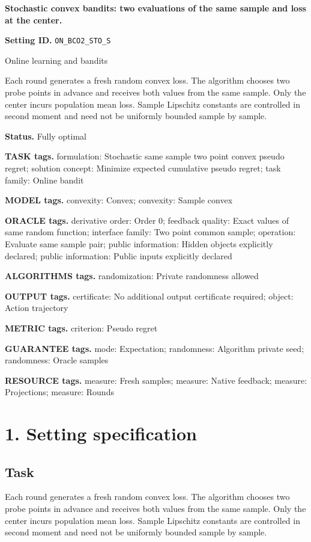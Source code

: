 \documentclass[10pt,a4paper]{article}
\begin{document}
\raggedright

{\LARGE\bfseries\sffamily\color{AtlasNavy} Stochastic convex bandits: two evaluations of the same sample and loss at the center.\par}\vspace{5pt}
\textbf{Setting ID.} \texttt{ON\_\allowbreak{}BCO2\_\allowbreak{}STO\_\allowbreak{}S}

Online learning and bandits

Each round generates a fresh random convex loss. The algorithm chooses two probe points in advance and receives both values from the same sample. Only the center incurs population mean loss. Sample Lipschitz constants are controlled in second moment and need not be uniformly bounded sample by sample.

\textbf{Status.} Fully optimal

\textbf{TASK tags.} formulation: Stochastic same sample two point convex pseudo regret; solution concept: Minimize expected cumulative pseudo regret; task family: Online bandit

\textbf{MODEL tags.} convexity: Convex; convexity: Sample convex

\textbf{ORACLE tags.} derivative order: Order 0; feedback quality: Exact values of same random function; interface family: Two point common sample; operation: Evaluate same sample pair; public information: Hidden objects explicitly declared; public information: Public inputs explicitly declared

\textbf{ALGORITHMS tags.} randomization: Private randomness allowed

\textbf{OUTPUT tags.} certificate: No additional output certificate required; object: Action trajectory

\textbf{METRIC tags.} criterion: Pseudo regret

\textbf{GUARANTEE tags.} mode: Expectation; randomness: Algorithm private seed; randomness: Oracle samples

\textbf{RESOURCE tags.} measure: Fresh samples; measure: Native feedback; measure: Projections; measure: Rounds

\section{1. Setting specification}
\subsection{Task}
Each round generates a fresh random convex loss. The algorithm chooses two probe points in advance and receives both values from the same sample. Only the center incurs population mean loss. Sample Lipschitz constants are controlled in second moment and need not be uniformly bounded sample by sample.
\end{document}
